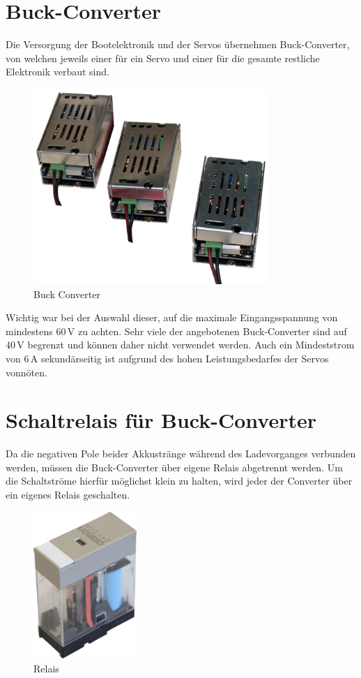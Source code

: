 \section{Buck-Converter}
Die Versorgung der Bootelektronik und der Servos übernehmen Buck-Converter, von welchen jeweils einer für ein Servo und einer für die gesamte restliche Elektronik verbaut sind.
\begin{figure}[h]
    \centering
    \includegraphics[width=0.8\textwidth]{Fotos/Buck_Converter.png}
    \caption{Buck Converter}
\end{figure}

Wichtig war bei der Auswahl dieser, auf die maximale Eingangsspannung von mindestens $60\,\mathrm{V}$ zu achten. Sehr viele der angebotenen Buck-Converter sind auf $40\,\mathrm{V}$ begrenzt und können daher nicht verwendet werden.
Auch ein Mindeststrom von $6\,\mathrm{A}$ sekundärseitig ist aufgrund des hohen Leistungsbedarfes der Servos vonnöten. 
\newpage

\section{Schaltrelais für Buck-Converter}
Da die negativen Pole beider Akkustränge während des Ladevorganges verbunden werden, müssen die Buck-Converter über eigene Relais abgetrennt werden. 
Um die Schaltströme hierfür möglichst klein zu halten, wird jeder der Converter über ein eigenes Relais geschalten.
\begin{figure}[h]
    \centering
    \includegraphics[width=0.35\textwidth]{Fotos/Relais_2.png}
    \caption{Relais}
\end{figure}

